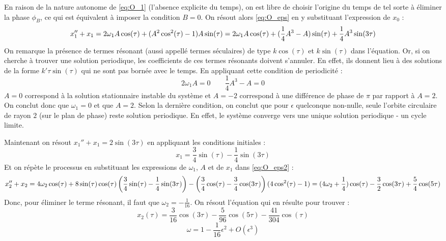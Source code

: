 %
En raison de la nature autonome de \eqref{eq:O_1} (l'absence explicite du temps), on est libre de choisir l'origine du temps de tel sorte à éliminer la phase $\phi_B$, 
ce qui est équivalent à imposer la condition $B = 0$. On résout alors \eqref{eq:O_eps} en y substituant l’expression de $x_0$ :
%
\begin{dmath}
    x_1'' + x_1 = 2\omega_1 A \cos(\tau) + (A^2 \cos^2(\tau) - 1)A\sin(\tau) \\
    = 2\omega_1 A \cos(\tau) + (\frac{1}{4}A^3 - A)\sin(\tau) + \frac{1}{4}A^3 \sin(3\tau)
\end{dmath}
%
On remarque la présence de termes résonant (aussi appellé termes séculaires) de type $k\cos(\tau)$ et $k\sin(\tau)$ dans l'équation. 
Or, si on cherche à trouver une solution periodique, les coefficients de ces termes résonants doivent s'annuler.
En effet, ils donnent lieu à des solutions de la forme $k' \tau \sin(\tau)$ qui ne sont pas bornée avec le temps.
En appliquant cette condition de periodicité :
%
\begin{equation}
    2\omega_1 A  = 0
    \qquad
    \frac{1}{4}A^3 - A = 0
\end{equation}
%
$A=0$ correspond à la solution stationnaire instable du système et $A=-2$ correspond à une différence de phase de $\pi$ par rapport à $A=2$. On conclut donc que $\omega_1 = 0$ et que $A=2$. 
Selon la dernière condition, on conclut que pour $\epsilon$ quelconque non-nulle, seule l'orbite circulaire de rayon $2$ (sur le plan de phase) reste solution periodique.
En effet, le système converge vers une unique solution periodique - un cycle limite.

Maintenant on résout $x_1'' + x_1 = 2\sin(3\tau)$ en appliquant les conditions initiales :
\begin{equation}
    x_1 = \frac{3}{4}\sin(\tau) - \frac{1}{4}\sin(3\tau)
\end{equation}
%
Et on répète le processus en substituant les expressions de $\omega_1$, $A$ et de $x_1$ dans \eqref{eq:O_eps2} :
%
\begin{dmath}
    x_2'' + x_2 = 4\omega_2\cos(\tau) + 8\sin(\tau)\cos(\tau)\left(\frac{3}{4}\sin(\tau) - \frac{1}{4}\sin(3\tau)\right) - \left(\frac{3}{4}\cos(\tau) - \frac{3}{4}\cos(3\tau)\right)(4\cos^2(\tau)-1) \\
    = (4\omega_2 + \frac{1}{4})\cos(\tau) - \frac{3}{2}\cos(3\tau) + \frac{5}{4}\cos(5\tau)
\end{dmath}
%
Donc, pour éliminer le terme résonant, il faut que $\omega_2 = -\frac{1}{16}$. On résout l'équation qui en résulte pour trouver :
%
\begin{equation}
    x_2(\tau) = \frac{3}{16}\cos(3\tau) - \frac{5}{96}\cos(5\tau) - \frac{41}{304}\cos(\tau)
\end{equation}
%
\begin{equation}
    \omega = 1 - \frac{1}{16}\epsilon^2 + O(\epsilon^3)
\end{equation}

